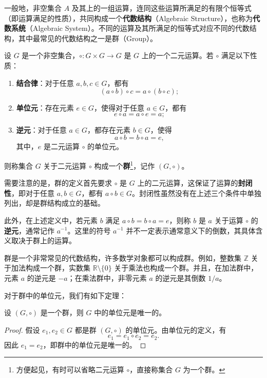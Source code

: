 一般地，非空集合 \(A\) 及其上的一组运算，连同这些运算所满足的有限个恒等式（即运算满足的性质），共同构成一个\textbf{代数结构}（Algebraic Structure），也称为\textbf{代数系统}（Algebraic System）。不同的运算及其所满足的恒等式对应不同的代数结构，其中最常见的代数结构之一是群（Group）。
\begin{definition}[群]
    \label{def_group}
    设 \(G\) 是一个非空集合，\(\circ: G \times G \rightarrow G\) 是 \(G\) 上的一个二元运算。若 \(\circ\) 满足以下性质：
    \begin{enumerate}
        \item \textbf{结合律}：对于任意 \(a,b,c\in G\)，都有
              \[
                  (a\circ b)\circ c=a\circ(b\circ c);
              \]
        \item \textbf{单位元}：存在元素 \(e\in G\)，使得对于任意 \(a\in G\)，都有
              \[
                  e\circ a=a\circ e=a;
              \]
        \item \textbf{逆元}：对于任意 \(a\in G\)，都存在元素 \(b\in G\)，使得
              \[
                  a\circ b=b\circ a=e,
              \]
              其中，\(e\) 是二元运算 \(\circ\) 的单位元。
    \end{enumerate}
    则称集合 \(G\) 关于二元运算 \(\circ\) 构成一个\textbf{群}\footnote{方便起见，有时可以省略二元运算 \(\circ\)，直接称集合 \(G\) 为一个群。}，记作 \((G,\circ)\)。
\end{definition}
需要注意的是，群的定义首先要求 \(\circ\) 是 \(G\) 上的二元运算，这保证了运算的\textbf{封闭性}，即对于任意 \(a,b\in G\)，都有 \(a\circ b\in G\)。封闭性虽然没有在上述三个条件中单独列出，却是群结构成立的基础。

此外，在上述定义中，若元素 \(b\) 满足 \(a\circ b=b\circ a=e\)，则称 \(b\) 是 \(a\) 关于运算 \(\circ\) 的\textbf{逆元}，通常记作 \(a^{-1}\)。这里的符号 \(a^{-1}\) 并不一定表示通常意义下的倒数，其具体含义取决于群上的运算。

群是一个非常常见的代数结构，许多数学对象都可以构成群。例如，整数集 \(\mathbb Z\) 关于加法构成一个群，实数集 \(\mathbb R\setminus\{0\}\) 关于乘法也构成一个群。并且，在加法群中，元素 \(a\) 的逆元是 \(-a\)；在乘法群中，非零元素 \(a\) 的逆元是其倒数 \(1/a\)。

对于群中的单位元，我们有如下定理：
\begin{theorem}[单位元的唯一性]
    \label{thm_identity_unique}
    设 \((G,\circ)\) 是一个群，则 \(G\) 中的单位元是唯一的。
\end{theorem}
\begin{proof}
    假设 \(e_1,e_2\in G\) 都是群 \((G,\circ)\) 的单位元。由单位元的定义，有
    \[
        e_1=e_1\circ e_2=e_2.
    \]
    因此 \(e_1=e_2\)，即群中的单位元是唯一的。
\end{proof}

